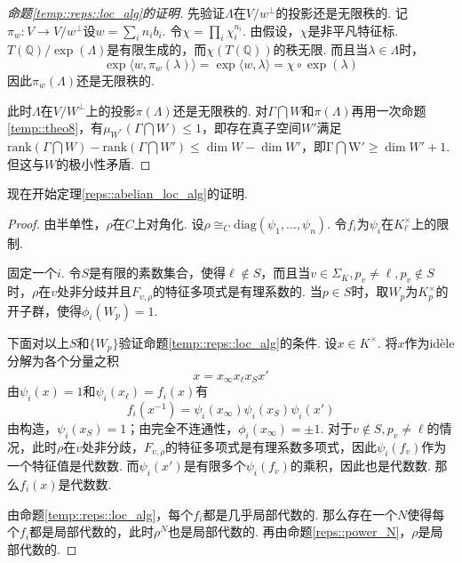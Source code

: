 \begin{proof}[命题\ref{temp::reps::loc_alg}的证明]
    先验证$\Lambda$在$V/w^{\perp}$的投影还是无限秩的. 记$\pi_w: V\to V/w^{\perp}$设$w = \sum_i n_i b_i$. 令$\chi = \prod_i \chi_i^{n_i}$. 由假设，$\chi$是非平凡特征标.
    $T(\mathbb{Q})/\exp(\Lambda)$是有限生成的，而$\chi(T(\mathbb{Q}))$的秩无限. 而且当$\lambda\in \Lambda$时，
    \begin{equation}
        \exp \langle w, \pi_w(\lambda)\rangle = \exp \langle w, \lambda\rangle = \chi \circ \exp (\lambda)
    \end{equation}
    因此$\pi_w(\Lambda)$还是无限秩的.

    此时$\Lambda$在$V/W^{\perp}$上的投影$\pi(\Lambda)$还是无限秩的. 对$\Gamma\bigcap W$和$\pi(\Lambda)$再用一次命题\ref{temp::theo8}，有$\mu_{W^{*}}(\Gamma\bigcap W)\leq 1$，即存在真子空间$W'$满足$\mathrm{rank}(\Gamma\bigcap W) - \mathrm{rank}(\Gamma\bigcap W') \leq \dim W - \dim W'$，即$\mathrm{\Gamma \bigcap W'}\geq \dim W' + 1$. 但这与$W$的极小性矛盾.

\end{proof}

现在开始定理\ref{reps::abelian_loc_alg}的证明.
\begin{proof}

    由半单性，$\rho$在$C$上对角化. 设$\rho \cong_{C} \mathrm{diag}(\psi_1,\ldots,\psi_n)$. 令$f_i$为$\psi_i$在$K_{\ell}^{\times}$上的限制.

    固定一个$i$.
    令$S$是有限的素数集合，使得$\ell\not\in S$，而且当$v\in \Sigma_K, p_v\neq \ell, p_v\not\in S$时，$\rho$在$v$处非分歧并且$F_{v,\rho}$的特征多项式是有理系数的.
    当$p\in S$时，取$W_p$为$K_{p}^{\times}$的开子群，使得$\phi_i(W_p)=1$.

    下面对以上$S$和$\{W_p\}$验证命题\ref{temp::reps::loc_alg}的条件. 设$x\in K^{\times}$. 将$x$作为idèle分解为各个分量之积
    \begin{equation}
        x = x_{\infty} x_{\ell} x_{S} x'
    \end{equation}
    由$\psi_i(x) = 1$和$\psi_i(x_{\ell}) = f_i(x)$有
    \begin{equation}
        f_i(x^{-1}) = \psi_i(x_{\infty})\psi_i(x_S)\psi_i(x')
    \end{equation}
    由构造，$\psi_i(x_S)=1$；由完全不连通性，$\phi_i(x_{\infty})=\pm 1$. 对于$v\not\in S, p_v\neq \ell$的情况，此时$\rho$在$v$处非分歧，$F_{v,\rho}$的特征多项式是有理系数多项式，因此$\psi_i(f_v)$作为一个特征值是代数数. 而$\psi_i(x')$是有限多个$\psi_i(f_v)$的乘积，因此也是代数数. 那么$f_i(x)$是代数数.

    由命题\ref{temp::reps::loc_alg}，每个$f_i$都是几乎局部代数的. 那么存在一个$N$使得每个$f_i$都是局部代数的，此时$\rho^N$也是局部代数的. 再由命题\ref{reps::power_N}，$\rho$是局部代数的.
\end{proof}
